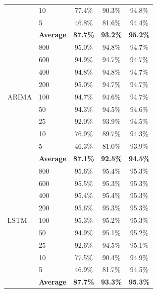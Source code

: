 \documentclass[11pt,a4paper]{article}
\begin{document}
\begin{table}[H]
\begin{tabular}{llccc}
 & 10  & 77.4\% & 90.3\% & 94.8\% \\
 & 5   & 46.8\% & 81.6\% & 94.4\% \\
 & \textbf{Average} & \textbf{87.7\%} & \textbf{93.2\%} & \textbf{95.2\%} \\
\midrule
\multirow{9}{*}{ARIMA}
 & 800 & 95.0\% & 94.8\% & 94.7\% \\
 & 600 & 94.9\% & 94.7\% & 94.7\% \\
 & 400 & 94.8\% & 94.8\% & 94.7\% \\
 & 200 & 95.0\% & 94.7\% & 94.7\% \\
 & 100 & 94.7\% & 94.6\% & 94.7\% \\
 & 50  & 94.3\% & 94.5\% & 94.6\% \\
 & 25  & 92.0\% & 93.9\% & 94.5\% \\
 & 10  & 76.9\% & 89.7\% & 94.3\% \\
 & 5   & 46.3\% & 81.0\% & 93.9\% \\
 & \textbf{Average} & \textbf{87.1\%} & \textbf{92.5\%} & \textbf{94.5\%} \\
\midrule
\multirow{9}{*}{LSTM}
 & 800 & 95.6\% & 95.4\% & 95.3\% \\
 & 600 & 95.5\% & 95.3\% & 95.3\% \\
 & 400 & 95.4\% & 95.4\% & 95.3\% \\
 & 200 & 95.6\% & 95.3\% & 95.3\% \\
 & 100 & 95.3\% & 95.2\% & 95.3\% \\
 & 50  & 94.9\% & 95.1\% & 95.2\% \\
 & 25  & 92.6\% & 94.5\% & 95.1\% \\
 & 10  & 77.5\% & 90.4\% & 94.9\% \\
 & 5   & 46.9\% & 81.7\% & 94.5\% \\
 & \textbf{Average} & \textbf{87.7\%} & \textbf{93.3\%} & \textbf{95.3\%} \\
\bottomrule
\end{tabular}
\end{table}
\end{document}

